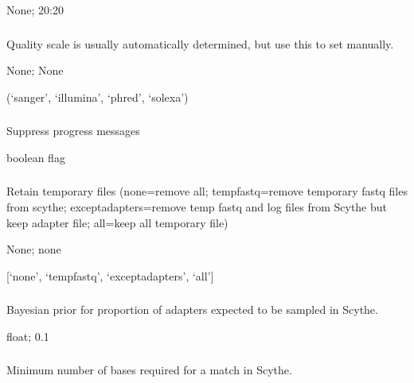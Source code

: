 \documentclass[letterpaper,11pt,english]{sphinxmanual}
\begin{document}
 None;  20:20


\subsubsection{}
\label{\detokenize{prog_desc:quality-scale}}
 Quality scale is usually automatically determined, but use this to set manually.

 None;  None

 (‘sanger’, ‘illumina’, ‘phred’, ‘solexa’)


\subsubsection{}
\label{\detokenize{prog_desc:id6}}
 Suppress progress messages

 boolean flag


\subsubsection{}
\label{\detokenize{prog_desc:retain-temp}}
 Retain temporary files (none=remove all; tempfastq=remove temporary fastq files from scythe; exceptadapters=remove temp fastq and log files from Scythe but keep adapter file; all=keep all temporary file)

 None;  none

 {[}‘none’, ‘tempfastq’, ‘exceptadapters’, ‘all’{]}


\subsubsection{}
\label{\detokenize{prog_desc:s-scythe-prior}}
 Bayesian prior for proportion of adapters expected to be sampled in Scythe.

 float;  0.1


\subsubsection{}
\label{\detokenize{prog_desc:scythe-match}}
 Minimum number of bases required for a match in Scythe.
\end{document}
